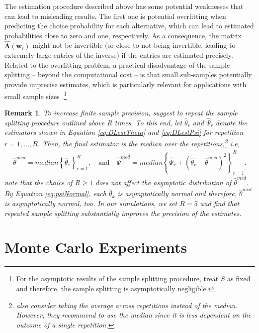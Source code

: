 \documentclass[a4paper, 12pt]{article}
\newtheorem{preremark}{Remark}
\newenvironment{remark}%
  {\begin{preremark}\upshape}{\end{preremark}}
\begin{document}
The estimation procedure described above has some potential weaknesses that can lead to misleading results. The first one is potential overfitting when predicting the choice probability for each alternative, which can lead to estimated probabilities close to zero and one, respectively. 
As a consequence, the matrix $\hat{\bm{\Lambda}}(\bm{w}_i)$ might not be invertible (or close to not being invertible, leading to extremely large entries of the inverse) if the entries are estimated precisely.
Related to the overfitting problem, a practical disadvantage of the sample splitting -- beyond the computational cost -- is that small sub-samples potentially provide imprecise estimates, which is particularly relevant for applications with small sample sizes \cite{farrell2020}.\footnote{For the asymptotic results of the sample splitting procedure,    treat  $S$  as fixed and therefore,  the sample splitting  is asymptotically negligible.}
\begin{remark} \label{rem:repeatedCV}
To increase finite sample precision,   suggest to repeat the sample splitting procedure outlined above $R$ times. To this end, let $\hat{\theta}_r$ and  $\hat{\Psi}_r$  denote the estimators shown in Equation \eqref{eq:DLestTheta} and \eqref{eq:DLestPsi} for repetition $r= 1, \ldots, R$. Then, the final estimator is the median over the repetitions,\footnote{ also consider taking the average across repetitions instead of the median. However, they recommend to use the median since it is less dependent on the outcome of a single repetition.} i.e,
\begin{align*}
\hat{\theta}^{med} = median\left\{\hat{\theta}_r\right\}_{r=1}^{R}, \quad\text{and} \quad
\hat{\Psi}^{med} = median\left\{\hat{\Psi}_r + \left(\hat{\theta}_r - \hat{\theta}^{med}  \right)^2\right\}_{r=1}^{R}.
\end{align*}
 note that the choice of $R\geq1$ does not affect the asymptotic distribution of $\hat{\theta}^{med}$.  By Equation \eqref{eq:psiNormal}, each $\hat{\theta}_k$ is asymptotically normal and therefore,  $\hat{\theta}^{med}$ is asymptotically normal, too. In our simulations, we set $R=5$ and find that repeated sample splitting substantially improves the precision of the estimates.
\end{remark}








\section{Monte Carlo Experiments}\label{secDL:Monte_Carlo}
\end{document}
